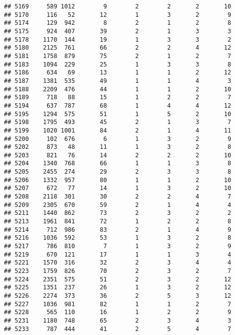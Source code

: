 \documentclass[]{article}
\begin{document}
\begin{verbatim}
## 5169     589 1012        9        2        2       2       10
## 5170     116   52       12        1        3       2        9
## 5174     129  942        8        2        1       2        8
## 5175     924  407       39        2        1       3        3
## 5178    1170  144       19        1        3       3        2
## 5180    2125  761       66        2        2       4       12
## 5181    1758  879       75        2        1       2        7
## 5183    1094  229       25        1        3       3        8
## 5186     634   69       13        1        1       2       12
## 5187    1381  535       49        1        1       4        3
## 5188    2209  476       44        1        1       2       10
## 5189     718   88       15        1        2       2        7
## 5194     637  787       68        1        4       4       12
## 5195    1294  575       51        1        5       2       10
## 5198    1795  493       45        2        1       3        7
## 5199    1020 1001       84        2        1       4       11
## 5200     102  676        6        1        3       2        9
## 5202     873   48       11        1        3       2        8
## 5203     821   76       14        2        2       2       10
## 5204    1340  768       66        1        1       3        8
## 5205    2455  274       29        2        3       3        8
## 5206    1332  957       80        1        1       2       10
## 5207     672   77       14        1        3       2       10
## 5208    2118  301       30        2        2       4        7
## 5209    2305  670       59        2        1       4        4
## 5211    1440  862       73        2        3       2        2
## 5213    1961  841       72        1        2       2        8
## 5214     712  986       83        2        1       4        9
## 5216    1036  592       53        1        3       2        8
## 5217     786  810        7        1        3       2        9
## 5219     670  121       17        1        1       3        4
## 5221    1570  316       32        2        3       4        4
## 5223    1759  826       70        2        3       2        7
## 5224    2351  575       51        2        3       2       12
## 5225    1351  237       26        1        3       2       12
## 5226    2274  373       36        2        5       3       12
## 5227    1036  981       82        1        1       2        7
## 5228     565  110       16        1        2       2        9
## 5231    1180  748       65        2        3       4        3
## 5233     787  444       41        2        5       4        7

\end{verbatim}
\end{document}
